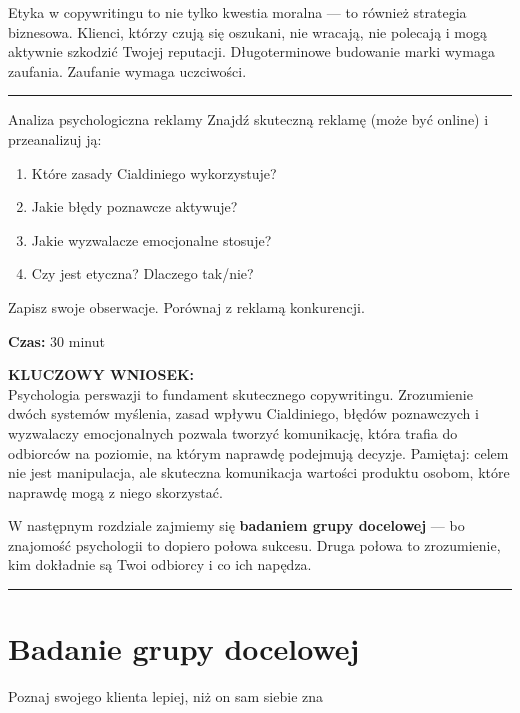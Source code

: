 \documentclass[
  12pt,
  a4paper,
  twoside,
  openright,
  12pt,
  DIV=12,
  BCOR=12mm]{scrbook}
\newcommand{\decoline}{%
  \begin{center}
    \textcolor{bordergray}{\rule{0.3\textwidth}{0.5pt}}
  \end{center}
}
\newcommand{\takeaway}[1]{%
  \begin{tcolorbox}[
    enhanced,
    colback=accentgreen!10,
    colframe=accentgreen,
    boxrule=0pt,
    borderline south={3pt}{0pt}{accentgreen},
    sharp corners,
    left=15pt, right=15pt, top=10pt, bottom=10pt
  ]
    \textbf{\color{accentgreen}KLUCZOWY WNIOSEK:}\\[5pt]
    #1
  \end{tcolorbox}
}
\begin{document}
\begin{wazne}
Etyka w copywritingu to nie tylko kwestia moralna --- to również strategia biznesowa. Klienci, którzy czują się oszukani, nie wracają, nie polecają i mogą aktywnie szkodzić Twojej reputacji. Długoterminowe budowanie marki wymaga zaufania. Zaufanie wymaga uczciwości.
\end{wazne}

\decoline

\begin{cwiczenie}{Analiza psychologiczna reklamy}
Znajdź skuteczną reklamę (może być online) i przeanalizuj ją:

\begin{enumerate}
  \item Które zasady Cialdiniego wykorzystuje?
  \item Jakie błędy poznawcze aktywuje?
  \item Jakie wyzwalacze emocjonalne stosuje?  
  \item Czy jest etyczna? Dlaczego tak/nie?
\end{enumerate}

Zapisz swoje obserwacje. Porównaj z reklamą konkurencji.

\textbf{Czas:} 30 minut
\end{cwiczenie}

\takeaway{Psychologia perswazji to fundament skutecznego copywritingu. Zrozumienie dwóch systemów myślenia, zasad wpływu Cialdiniego, błędów poznawczych i wyzwalaczy emocjonalnych pozwala tworzyć komunikację, która trafia do odbiorców na poziomie, na którym naprawdę podejmują decyzje. Pamiętaj: celem nie jest manipulacja, ale skuteczna komunikacja wartości produktu osobom, które naprawdę mogą z niego skorzystać.}

W następnym rozdziale zajmiemy się \textbf{badaniem grupy docelowej} ---
bo znajomość psychologii to dopiero połowa sukcesu. Druga połowa to
zrozumienie, kim dokładnie są Twoi odbiorcy i co ich napędza.

\decoline


\chapter{Badanie grupy docelowej}\label{badanie-grupy-docelowej}

Poznaj swojego klienta lepiej, niż on sam siebie zna

\hfill\break
\end{document}
